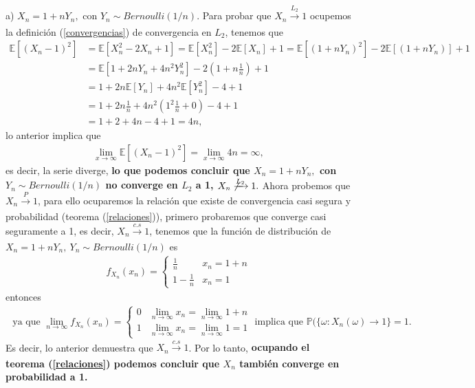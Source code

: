 \documentclass[11pt,letterpaper]{article}
\newcommand{\mP}{\mathbb{P}}
\newcommand{\mE}{\mathbb{E}}
\begin{document}
a) $X_n=1+nY_n,$ con $Y_n\sim Bernoulli(1/n)$. Para probar que $X_n\xrightarrow[]{L_2} 1$ ocupemos la definición (\ref{convergencias}) de convergencia en $L_2$, tenemos que 
\begin{align*}
\mE[\left( X_n-1\right)^2]&=\mE[X_n^2-2X_n+1]=\mE[X_n^2]-2\mE[X_n]+1= \mE[\left(1+nY_n\right)^2]-2\mE[\left(1+nY_n\right)]+1\\
&=\mE[1+2nY_n+4n^2Y_n^2]-2\left(1+n\frac{1}{n}\right)+1\\
&=1+2n\mE[Y_n]+4n^2\mE[Y_n^2]-4+1\\
&=1+2n\frac{1}{n}+4n^2\left(1^2\frac{1}{n}+0\right)-4+1\\
&=1+2+4n-4+1=4n,
\end{align*}  
lo anterior implica que
\begin{align*}
\lim_{x\rightarrow \infty} \mE[\left( X_n-1\right)^2]=\lim_{x\rightarrow \infty} 4n = \infty,
\end{align*}
es decir, la serie diverge, \textbf{lo que podemos concluir que $X_n=1+nY_n,$ con $Y_n\sim Bernoulli(1/n)$ no converge en $L_2$ a 1, $X_n \not \xrightarrow[]{L_2} 1.$ } Ahora probemos que $X_n\xrightarrow[]{P} 1$, para ello ocuparemos la relación que existe de convergencia casi segura y probabilidad (teorema (\ref{relaciones})), primero probaremos que converge casi seguramente a 1, es decir, $X_n\xrightarrow[]{c.s} 1$, tenemos que la función de distribución de $X_n=1+nY_n, \ Y_n\sim Bernoulli(1/n)$ es
\begin{align*}
f_{X_n}(x_n)=\left\{ \begin{array}{cc}
\frac{1}{n} & x_n=1+n \\
1-\frac{1}{n}& x_n=1 
\end{array} \right.
\end{align*}
entonces 
\begin{align*}
\text{ ya que }\lim_{n\rightarrow \infty}f_{X_n}(x_n)=\left\{ \begin{array}{cc}
0& \lim_{n\rightarrow \infty}x_n = \lim_{n\rightarrow \infty}1+n \\
1 & \lim_{n\rightarrow \infty}x_n =\lim_{n\rightarrow \infty}1 = 1 
\end{array} \right. \text{ implica que }\mP(\{\omega: X_n(\omega) \rightarrow 1 \}=1.
\end{align*}
Es decir, lo anterior demuestra que $X_n\xrightarrow[]{c.s} 1$. Por lo tanto, \textbf{ocupando el teorema (\ref{relaciones}) podemos concluir que $X_n$ también converge en probabilidad a 1.}
\end{document}
